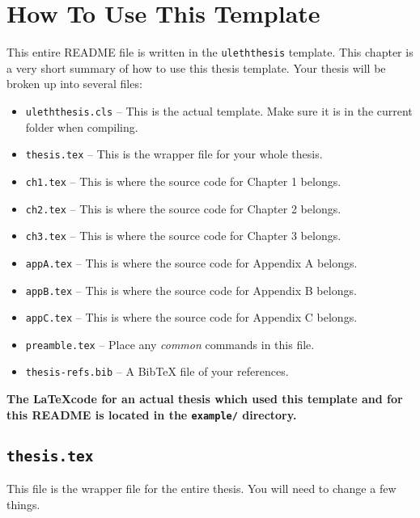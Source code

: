 \chapter[How To Use This Template]{How To Use This Template}
\label{ch:summary}

This entire README file is written in the \texttt{uleththesis} template. This chapter is a very short summary of how to use this thesis template. Your thesis will be broken up into several files:

\begin{itemize}
 \item \texttt{uleththesis.cls} -- This is the actual template. Make sure it is in the current folder when compiling.
 \item \texttt{thesis.tex} -- This is the wrapper file for your whole thesis.
 \item \texttt{ch1.tex} -- This is where the source code for Chapter 1 belongs.
 \item \texttt{ch2.tex} -- This is where the source code for Chapter 2 belongs.
 \item \texttt{ch3.tex} -- This is where the source code for Chapter 3 belongs.
 \item \texttt{appA.tex} -- This is where the source code for Appendix A belongs.
 \item \texttt{appB.tex} -- This is where the source code for Appendix B belongs.
 \item \texttt{appC.tex} -- This is where the source code for Appendix C belongs.
 \item \texttt{preamble.tex} -- Place any {\it common} commands in this file.
 \item \texttt{thesis-refs.bib} -- A BibTeX file of your references.
\end{itemize}

{\color{red} {\bf The \LaTeX code for an actual thesis which used this template and for this README is located in the \texttt{example/} directory.}}

\section[\texttt{thesis.tex}]{\texttt{thesis.tex}}
\label{sec:thesis_tex}

This file is the wrapper file for the entire thesis. You will need to change a few things.

